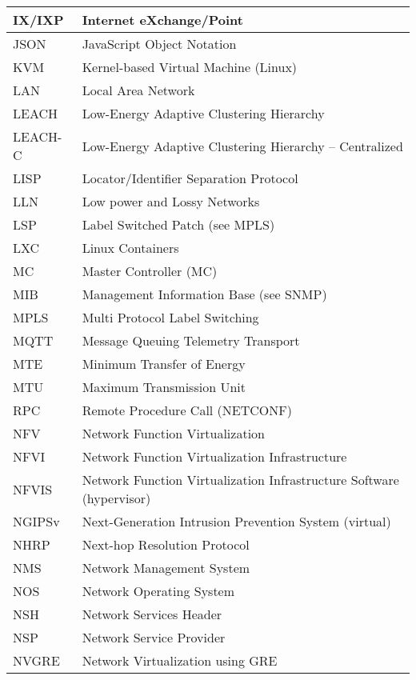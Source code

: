 \begin{longtable}{ll}
  IX/IXP	&		Internet eXchange/Point		\\ \midrule
  JSON		&		JavaScript Object Notation		\\ \midrule
  KVM		&		Kernel-based Virtual Machine (Linux)		\\ \midrule
  LAN		&		Local Area Network		\\ \midrule
  LEACH		&		Low-Energy Adaptive Clustering Hierarchy		\\ \midrule
  LEACH-C	&		Low-Energy Adaptive Clustering Hierarchy – Centralized		\\ \midrule
  LISP		&		Locator/Identifier Separation Protocol		\\ \midrule
  LLN		&		Low power and Lossy Networks		\\ \midrule
  LSP		&		Label Switched Patch (see MPLS)		\\ \midrule
  LXC		&		Linux Containers		\\ \midrule
  MC		&		Master Controller (MC)		\\ \midrule
  MIB		&		Management Information Base (see SNMP)		\\ \midrule
  MPLS		&		Multi Protocol Label Switching		\\ \midrule
  MQTT		&		Message Queuing Telemetry Transport		\\ \midrule
  MTE		&		Minimum Transfer of Energy		\\ \midrule
  MTU		&		Maximum Transmission Unit		\\ \midrule
  RPC		&		Remote Procedure Call (NETCONF)		\\ \midrule
  NFV		&		Network Function Virtualization		\\ \midrule
  NFVI		&		Network Function Virtualization Infrastructure		\\ \midrule
  NFVIS		&		Network Function Virtualization Infrastructure Software (hypervisor)		\\ \midrule
  NGIPSv	&		Next-Generation Intrusion Prevention System (virtual)		\\ \midrule
  NHRP		&		Next-hop Resolution Protocol		\\ \midrule
  NMS		&		Network Management System		\\ \midrule
  NOS		&		Network Operating System		\\ \midrule
  NSH		&		Network Services Header		\\ \midrule
  NSP		&		Network Service Provider		\\ \midrule
  NVGRE		&		Network Virtualization using GRE		\\ \midrule

\end{longtable}
